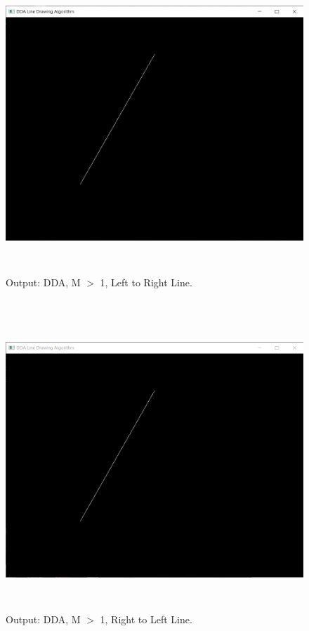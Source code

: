 \documentclass[12pt, a4]{article}
\begin{document}
\newpage
\subsection*{}
\begin{figure}[h]
\centering
\caption{Output: DDA, M $>$ 1, Left to Right Line.}
\includegraphics[height=11.25cm, width=15cm]{Outputs/3-DDA.png}
\end{figure}

\newpage
\subsection*{}
\begin{figure}[h]
\centering
\caption{Output: DDA, M $>$ 1, Right to Left Line.}
\includegraphics[height=11.25cm, width=15cm]{Outputs/4-DDA.png}
\end{figure}
\end{document}
